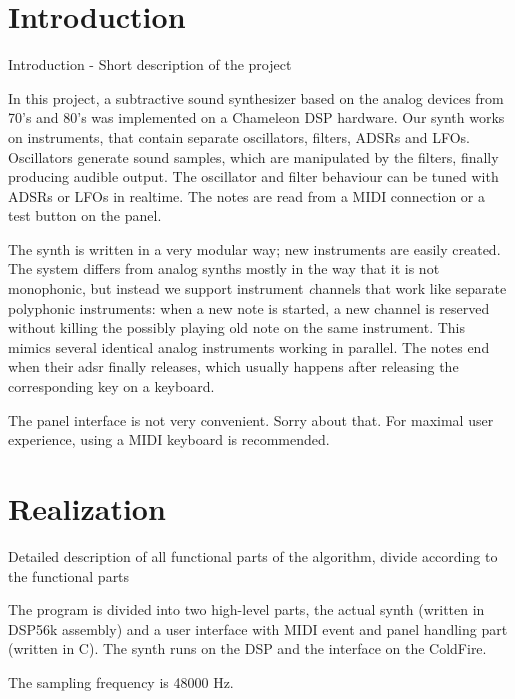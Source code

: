 \documentclass[10pt,a4paper,oneside]{article}
\begin{document}
\maketitle

\section{Introduction}

\cite{LaTeXhomepage}

Introduction - Short description of the project

In this project, a subtractive sound synthesizer based on the analog devices from 70's and 80's was implemented on a Chameleon DSP hardware. Our synth works on instruments, that contain separate oscillators, filters, ADSRs and LFOs. Oscillators generate sound samples, which are manipulated by the filters, finally producing audible output. The oscillator and filter behaviour can be tuned with ADSRs or LFOs in realtime. The notes are read from a MIDI connection or a test button on the panel.

The synth is written in a very modular way; new instruments are easily created. The system differs from analog synths mostly in the way that it is not monophonic, but instead we support instrument \emph channels that work like separate polyphonic instruments: when a new note is started, a new channel is reserved without killing the possibly playing old note on the same instrument. This mimics several identical analog instruments working in parallel. The notes end when their adsr finally releases, which usually happens after releasing the corresponding key on a keyboard.

The panel interface is not very convenient. Sorry about that. For maximal user experience, using a MIDI keyboard is recommended.


\section{Realization}

Detailed description of all functional parts of the algorithm, divide according to the functional parts

The program is divided into two high-level parts, the actual synth (written in DSP56k assembly) and a user interface with MIDI event and panel handling part (written in C). The synth runs on the DSP and the interface on the ColdFire.

The sampling frequency is 48000 Hz.
\end{document}
